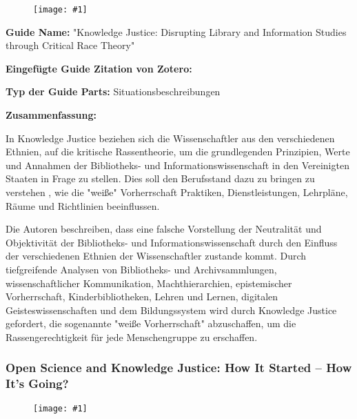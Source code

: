 \documentclass{article}
\newlength{\imgwidth}
\newcommand\scaledgraphics[2]{%
                
\settowidth{\imgwidth}{\texttt{[image: \#1]}}%
                
\setlength{\imgwidth}{\minof{\imgwidth}{#2\textwidth}}%
                
\texttt{[image: \#1]}%
                
}
\begin{document}
\begin{center}
\begin{figure}
\scaledgraphics{dcc1d35b-4186-4b50-a5a6-cf54422a8064.jpeg}{0.5}
\label{F29320001}
\end{figure}


\end{center}





\textbf{Guide Name:} "Knowledge Justice: Disrupting Library and Information Studies through Critical Race Theory"


\textbf{Eingefügte Guide Zitation von Zotero:} \autocite{leung_knowledge_2021}


\textbf{Typ der Guide Parts:} Situationsbeschreibungen


\textbf{Zusammenfassung:} 

In Knowledge Justice beziehen sich die Wissenschaftler aus den verschiedenen Ethnien, auf die kritische Rassentheorie, um die grundlegenden Prinzipien, Werte und Annahmen der Bibliotheks- und Informationswissenschaft in den Vereinigten Staaten in Frage zu stellen. Dies soll den Berufsstand dazu zu bringen zu verstehen , wie die "weiße" Vorherrschaft Praktiken, Dienstleistungen, Lehrpläne, Räume und Richtlinien beeinflussen.


Die Autoren beschreiben, dass eine falsche Vorstellung der Neutralität und Objektivität der Bibliotheks- und Informationswissenschaft durch den Einfluss der verschiedenen Ethnien der Wissenschaftler zustande kommt. Durch tiefgreifende Analysen von Bibliotheks- und Archivsammlungen, wissenschaftlicher Kommunikation, Machthierarchien, epistemischer Vorherrschaft, Kinderbibliotheken, Lehren und Lernen, digitalen Geisteswissenschaften und dem Bildungssystem wird durch Knowledge Justice gefordert, die sogenannte "weiße Vorherrschaft" abzuschaffen, um die Rassengerechtigkeit für jede Menschengruppe zu erschaffen. 


\subsubsection{Open Science and Knowledge Justice: How It Started – How It’s Going?}\label{H480694}


\begin{figure}
\scaledgraphics{e590694e-3a8f-4a2f-801f-704d7d8edbc0.png}{1}
\label{F3873651}
\end{figure}
\end{document}
